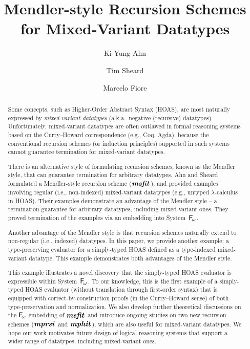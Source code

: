 \documentclass[a4paper,UKenglish]{lipics}
\title{Mendler-style Recursion Schemes for Mixed-Variant Datatypes
	}
\author[1]{Ki Yung Ahn}
\author[1]{Tim Sheard}
\author[2]{Marcelo Fiore}
\affil[1]{Department of Computer Science, Portland State University\\
  Oregon, USA\\
  \texttt{\{kya,sheard\}@cs.pdx.edu}}
\affil[2]{Computer Laboratory, University of Cambridge\\
  Cambridge, UK\\
  \texttt{Marcelo.Fiore@cl.cam.ac.uk}}
\newcommand{\eg}[0]{{e.g.}}
\newcommand{\ie}[0]{{i.e.}}
\newcommand{\aka}[0]{{a.k.a.}}
\newcommand{\Fw}[0]{{\ensuremath{\mathsf{\uppercase{F}}_{\!\omega}}}}
\newcommand{\msfit}[1]{\ensuremath{\textbf{\textit{msfit}}_{#1}}}
\newcommand{\mprsi}[1]{\ensuremath{\textbf{\textit{mprsi}}_{#1}}}
\newcommand{\mphit}[1]{\ensuremath{\textbf{\textit{mphit}}_{#1}}}
\begin{document}
\maketitle

\begin{abstract}
Some concepts, such as Higher-Order Abstract Syntax (HOAS),
are most naturally expressed by \emph{mixed-variant datatypes}
(\aka\ negative (recursive) datatypes). Unfortunately,
mixed-variant datatypes are often outlawed in formal reasoning systems
based on the Curry--Howard correspondence (\eg, Coq, Agda), because
the conventional recursion schemes (or induction principles) supported in
such systems cannot guarantee termination for mixed-variant datatypes.

There is an alternative style of formulating recursion schemes,
known as the Mendler style, that can guarantee termination for
arbitrary datatypes. Ahn and Sheard \cite{AhnShe11} formulated
a Mendler-style recursion scheme (\msfit{}), and provided
examples involving regular (\ie, non-indexed) mixed-variant datatypes
(\eg, untyped $\lambda$-calculus in HOAS). Their examples demonstrate
an advantage of the Mendler style -- a termination guarantee for
arbitrary datatypes, including mixed-variant ones. They proved
termination of the examples via an embedding into System~\Fw.

Another advantage of the Mendler style is that recursion schemes
naturally extend to non-regular (\ie, indexed) datatypes. In this paper,
we provide another example: a type-preserving evaluator for a simply-typed HOAS
defined as a type-indexed mixed-variant datatype. This example demonstrates
both advantages of the Mendler style.

This example illustrates a novel discovery that the simply-typed HOAS evaluator
is expressible within System~\Fw. To our knowledge, this is the first example of
a simply-typed HOAS evaluator (without translation through first-order syntax)
that is equipped with correct-by-construction proofs (in the Curry--Howard
sense) of both type-preservation and normalization. We also develop further
theoretical discussions on the \Fw-embedding of \msfit{}
and introduce ongoing studies on two new recursion schemes
(\mprsi{} and \mphit{}), which are also useful for mixed-variant datatypes.
We hope our work motivates future design of
logical reasoning systems that support a wider range of datatypes,
including mixed-variant ones.
\end{abstract}









\end{document}

